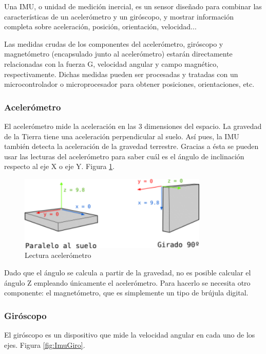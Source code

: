 Una IMU, o unidad de medición inercial, es un sensor diseñado para combinar las características de un acelerómetro y un giróscopo, y mostrar información completa sobre aceleración, posición, orientación, velocidad...

Las medidas crudas de los componentes del acelerómetro, giróscopo y magnetómetro (encapsulado junto al acelerómetro) estarán directamente relacionadas con la fuerza G, velocidad angular y campo magnético, respectivamente. Dichas medidas pueden ser procesadas y tratadas con un microcontrolador o microprocesador para obtener posiciones, orientaciones, etc.

\subsubsection{Acelerómetro}

El acelerómetro mide la aceleración en las 3 dimensiones del espacio. La gravedad de la Tierra tiene una aceleración perpendicular al suelo. Así pues, la IMU también detecta la aceleración de la gravedad terrestre. Gracias a ésta se pueden usar las lecturas del acelerómetro para saber cuál es el ángulo de inclinación respecto al eje X o eje Y. Figura \ref{fig:ImuAcel}.

\begin{figure}[h]
\centering
\includegraphics[width=90mm]{Figures/imu-acel.png}
\caption[Lectura acelerómetro]{Lectura acelerómetro}
\label{fig:ImuAcel}
\end{figure}

Dado que el ángulo se calcula a partir de la gravedad, no es posible calcular el ángulo Z empleando únicamente el acelerómetro. Para hacerlo se necesita otro componente: el magnetómetro, que es simplemente un tipo de brújula digital.

\subsubsection{Giróscopo}

El giróscopo es un dispositivo que mide la velocidad angular en cada uno de los ejes. Figura \ref{fig:ImuGiro}.

